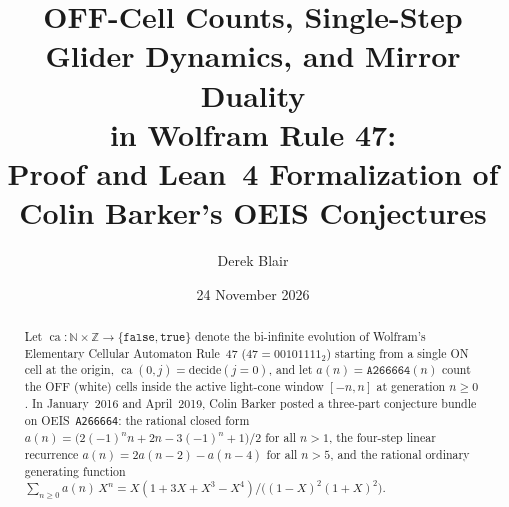 \documentclass[11pt]{article}
\title{OFF-Cell Counts, Single-Step Glider Dynamics, and Mirror Duality\\in Wolfram Rule 47:\\[2pt]
\large Proof and Lean~4 Formalization of Colin Barker's OEIS \seq{A266664} Conjectures}
\author{Derek Blair}
\date{24 November 2026}
\theoremstyle{definition}
\newcommand{\N}{\mathbb{N}}
\newcommand{\Z}{\mathbb{Z}}
\newcommand{\seq}[1]{\texttt{#1}}
\newcommand{\ca}{\operatorname{ca}}
\begin{document}
\maketitle

\begin{abstract}
Let $\ca : \N \times \Z \to \{\mathtt{false}, \mathtt{true}\}$ denote the bi-infinite evolution of Wolfram's Elementary Cellular Automaton Rule~47 ($47 = 00101111_2$) starting from a single ON cell at the origin, $\ca(0, j) = \mathrm{decide}(j = 0)$, and let $a(n) = \seq{A266664}(n)$ count the OFF (white) cells inside the active light-cone window $[-n, n]$ at generation $n \ge 0$. In January~2016 and April~2019, Colin Barker posted a three-part conjecture bundle on OEIS~\seq{A266664}: the rational closed form $a(n) = \bigl(2(-1)^n n + 2n - 3(-1)^n + 1\bigr)/2$ for all $n > 1$, the four-step linear recurrence $a(n) = 2a(n - 2) - a(n - 4)$ for all $n > 5$, and the rational ordinary generating function $\sum_{n \ge 0} a(n)\,X^n = X(1 + 3X + X^3 - X^4)/\bigl((1 - X)^2(1 + X)^2\bigr)$.


\end{abstract}
\end{document}
